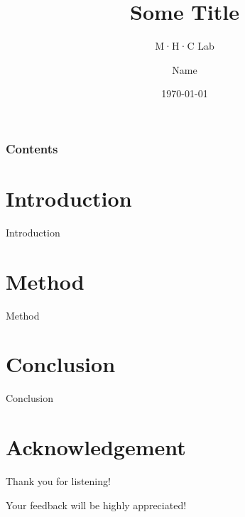 \documentclass[10pt]{beamer}
\title[City University of Macau]{Some Title
}
\subtitle{M·H·C Lab}
\author[Name]{Name}
\institute[@city.edu.mo]{ City University of Macau}
\date{\today}
\begin{document}
\frame{\titlepage}
\begin{frame}
\frametitle{Contents}
\tableofcontents
\end{frame}
\section{Introduction}
    \begin{frame}{Introduction}
    \end{frame}

\section{Method}
    \begin{frame}{Method}
    \end{frame}




\section{Conclusion}
    \begin{frame}{Conclusion}
    \end{frame}



\section*{Acknowledgement}  
\begin{frame}
\textcolor{myNewColorA}{\large{\centerline{Thank you for listening! }}}
\textcolor{myNewColorA}{\large{\centerline{ Your feedback will be highly appreciated!}}}
\end{frame}
\end{document}
